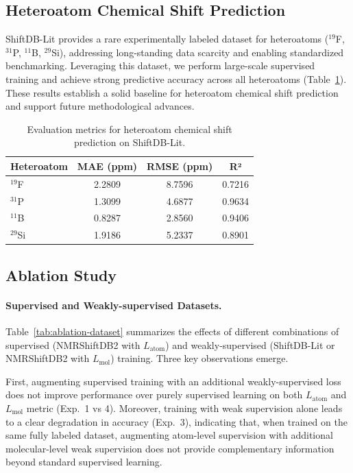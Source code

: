 


\subsection{Heteroatom Chemical Shift Prediction}

ShiftDB-Lit provides a rare experimentally labeled dataset for heteroatoms ($^{19}$F, $^{31}$P, $^{11}$B, $^{29}$Si), addressing long-standing data scarcity and enabling standardized benchmarking.
Leveraging this dataset, we perform large-scale supervised training and achieve strong predictive accuracy across all heteroatoms (Table~\ref{tab:hete}).
These results establish a solid baseline for heteroatom chemical shift prediction and support future methodological advances.


\begin{table}[H]
\centering
\caption{Evaluation metrics for heteroatom chemical shift prediction on ShiftDB-Lit.}
\label{tab:hete}

\begin{tabular}{lccc}
\toprule
\textbf{Heteroatom} & \textbf{MAE (ppm)} & \textbf{RMSE (ppm)} & \textbf{R²} \\
\midrule
$^{19}$F & 2.2809 & 8.7596 & 0.7216 \\
$^{31}$P & 1.3099 & 4.6877 & 0.9634 \\
$^{11}$B & 0.8287 & 2.8560 & 0.9406 \\
$^{29}$Si & 1.9186 & 5.2337 & 0.8901 \\
\bottomrule
\end{tabular}
\end{table}





\subsection{Ablation Study}

\paragraph{Supervised and Weakly-supervised Datasets.}

Table~\ref{tab:ablation-dataset} summarizes the effects of different combinations of supervised (NMRShiftDB2 with $L_{\text{atom}}$) and weakly-supervised (ShiftDB-Lit or NMRShiftDB2 with $L_{\text{mol}}$) training. Three key observations emerge.

First, augmenting supervised training with an additional weakly-supervised loss does not improve performance over purely supervised learning on both $L_{\text{atom}}$ and $L_{\text{mol}}$ metric (Exp.~1 vs 4). Moreover, training with weak supervision alone leads to a clear degradation in accuracy (Exp.~3), indicating that, when trained on the same fully labeled dataset, augmenting atom-level supervision with additional molecular-level weak supervision does not provide complementary information beyond standard supervised learning.

